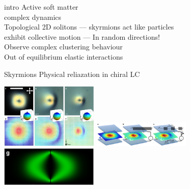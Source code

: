 \documentclass[t, 11pt, xcolor=dvipsnames]{beamer}
\begin{document}
\begin{frame}[plain]{intro}
  Active soft matter \\
  complex dynamics \\
  Topological 2D solitons --- skyrmions act like particles \\
  exhibit collective motion --- In random directions! \\
  Observe complex clustering behaviour \\
  Out of equilibrium elastic interactions \\
  \hypertarget<1>{slide2}{}
\end{frame}

\begin{frame}[plain]{Skyrmions}
  Physical reliazation in chiral LC \\
  \begin{center}
    \includegraphics[width=0.35\textwidth]{images/skyrm.png}
    \includegraphics[width=0.35\textwidth]{images/plate.png}
    \includegraphics[width=0.35\textwidth]{images/cross_sec.png}
  \end{center}
\end{frame}
\end{document}
